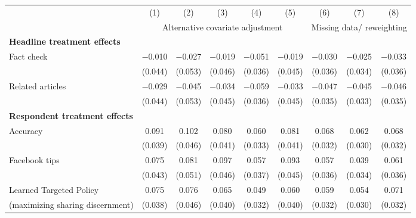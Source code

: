 
\begin{tabular}[t]{lcccccccc}
 & (1) & (2) & (3) & (4) & (5) & (6) & (7) & (8)\\& \multicolumn{5}{c}{Alternative covariate adjustment} & \multicolumn{3}{c}{Missing data/ reweighting}\\ 
\cmidrule(lr){2-6} \cmidrule(lr){7-9} \multicolumn{4}{l}{\textbf{Headline treatment effects}} \rule{0pt}{1.2\normalbaselineskip}\\
\hspace{1em}Fact check & \num{-0.010} & \num{-0.027} & \num{-0.019} & \num{-0.051} & \num{-0.019} & \num{-0.030} & \num{-0.025} & \num{-0.033}\\
 & (\num{0.044}) & (\num{0.053}) & (\num{0.046}) & (\num{0.036}) & (\num{0.045}) & (\num{0.036}) & (\num{0.034}) & (\num{0.036})\\
\hspace{1em}Related articles & \num{-0.029} & \num{-0.045} & \num{-0.034} & \num{-0.059} & \num{-0.033} & \num{-0.047} & \num{-0.045} & \num{-0.046}\\
 & (\num{0.044}) & (\num{0.053}) & (\num{0.045}) & (\num{0.036}) & (\num{0.045}) & (\num{0.035}) & (\num{0.033}) & (\num{0.035})\\\multicolumn{4}{l}{\textbf{Respondent treatment effects}} \rule{0pt}{1.2\normalbaselineskip}\\
\hspace{1em}Accuracy & \num{0.091} & \num{0.102} & \num{0.080} & \num{0.060} & \num{0.081} & \num{0.068} & \num{0.062} & \num{0.068}\\
 & (\num{0.039}) & (\num{0.046}) & (\num{0.041}) & (\num{0.033}) & (\num{0.041}) & (\num{0.032}) & (\num{0.030}) & (\num{0.032})\\
\hspace{1em}Facebook tips & \num{0.075} & \num{0.081} & \num{0.097} & \num{0.057} & \num{0.093} & \num{0.057} & \num{0.039} & \num{0.061}\\
 & (\num{0.043}) & (\num{0.051}) & (\num{0.046}) & (\num{0.037}) & (\num{0.045}) & (\num{0.036}) & (\num{0.034}) & (\num{0.036})\\
\hspace{1em}Learned Targeted Policy & \num{0.075} & \num{0.076} & \num{0.065} & \num{0.049} & \num{0.060} & \num{0.059} & \num{0.054} & \num{0.071}\\
 \hspace{1.5em}(maximizing sharing discernment) & (\num{0.038}) & (\num{0.046}) & (\num{0.040}) & (\num{0.032}) & (\num{0.040}) & (\num{0.032}) & (\num{0.030}) & (\num{0.032})\\

\end{tabular}
